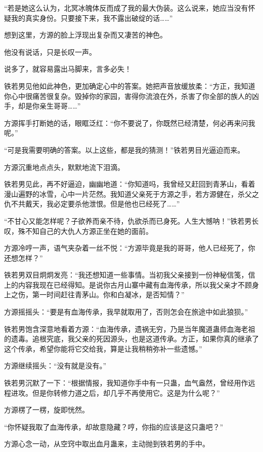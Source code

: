 \begin{this_body}
“若是她这么认为，北冥冰魄体反而成了我的最大伪装。这么说来，她应当没有怀疑我的真实身份。只要接下来，我不露出破绽的话……”

想到这里，方源的脸上浮现出复杂而又凄苦的神色。

他没有说话，只是长叹一声。

说多了，就容易露出马脚来，言多必失！

铁若男见他如此神色，更加确定心中的答案。她把声音放缓放柔：“方正，我知道你心中很痛苦很复杂。毁掉你的家园，害得你流浪在外，杀害了你全部的族人的凶手，却是你亲生哥哥……”

方源挥手打断她的话，眼眶泛红：“你不要说了，你既然已经清楚，何必再来问我呢。”

“可是我需要明确的答案。以上这些，都是我的猜测！”铁若男目光逼迫而来。

方源沉重地点点头，默默地流下泪滴。

铁若男见此，再不好逼迫，幽幽地道：“你知道吗，我曾经又赶回到青茅山，看着漫山遍野的冰雪，心中一片茫然。我知道父亲死于方源之手，若方源健在，杀父之仇不共戴天，我必定要杀他泄恨。但是他也已经死了……”

“不甘心又能怎样呢？子欲养而亲不待，仇欲杀而已身死。人生大憾呐！”铁若男长叹，殊不知自己的大仇人方源正坐在她的面前。

方源冷哼一声，语气夹杂着一丝不悦：“方源毕竟是我的哥哥，他人已经死了，你还想怎样？”

铁若男双目炯炯发亮：“我还想知道一些事情。当初我父亲接到一份神秘信笺，信上的内容我现在已经得知。是说你古月山寨中藏有血海传承，所以我父亲才不顾身上之伤，第一时间赶往青茅山。你和白凝冰，是否知情？”

方源摇摇头：“要是有血海传承，我早就取用了，否则怎会在旅途中如此狼狈。”

铁若男饱含深意地看着方源：“血海传承，遗祸无穷，乃是当年魔道蛊师血海老祖的遗毒。追根究底，我父亲的死因源头，也是这道传承。方正，如果你真的继承了这个传承，希望你能将它交给我，算是让我稍稍弥补一些遗憾。”

方源继续摇头：“没有就是没有。”

铁若男沉默了一下：“根据情报，我知道你手中有一只蛊，血气盎然，曾经用作远程进攻。但是你转修力道之后，却几乎不再使用它。这是为什么呢？”

方源楞了一楞，旋即恍然。

“你怀疑我取了血海传承，却故意隐藏？哼，你指的应该是这只蛊吧？”

方源心念一动，从空窍中取出血月蛊来，主动抛到铁若男的手中。


\end{this_body}
